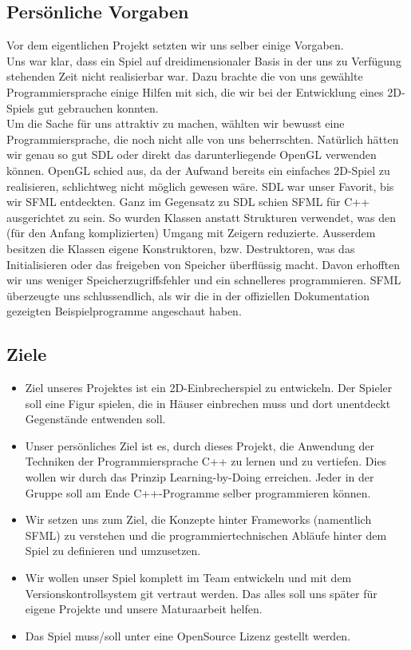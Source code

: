 \documentclass[12pt,a4paper]{scrartcl}
\begin{document}
\subsection{Persönliche Vorgaben}

Vor dem eigentlichen Projekt setzten wir uns selber einige Vorgaben.
\\
Uns war klar, dass ein Spiel auf dreidimensionaler Basis in der uns zu Verfügung stehenden Zeit nicht realisierbar war.
Dazu brachte die von uns gewählte Programmiersprache einige Hilfen mit sich, die wir bei der Entwicklung eines 2D-Spiels gut gebrauchen konnten.
\\
Um die Sache für uns attraktiv zu machen,
wählten wir bewusst eine Programmiersprache, die noch nicht
alle von uns beherrschten. Natürlich hätten wir genau so gut
SDL oder direkt das darunterliegende OpenGL verwenden können. OpenGL
schied aus, da der Aufwand bereits ein einfaches 2D-Spiel zu realisieren,
schlichtweg nicht möglich gewesen wäre. SDL war unser Favorit, bis wir
SFML entdeckten. Ganz im Gegensatz zu SDL schien SFML für C++ ausgerichtet
zu sein. So wurden Klassen anstatt Strukturen verwendet, was den (für den
Anfang komplizierten) Umgang mit Zeigern reduzierte. Ausserdem besitzen die
Klassen eigene Konstruktoren, bzw. Destruktoren, was das Initialisieren
oder das freigeben von Speicher überflüssig macht. Davon erhofften wir uns
weniger Speicherzugriffsfehler und ein schnelleres programmieren. SFML
überzeugte uns schlussendlich, als wir die in der offiziellen Dokumentation
gezeigten Beispielprogramme angeschaut haben.

\subsection{Ziele}
\begin{itemize}
\item 
Ziel unseres Projektes ist ein 2D-Einbrecherspiel zu entwickeln. Der Spieler soll eine Figur spielen, die in Häuser einbrechen muss und dort unentdeckt Gegenstände entwenden soll.
\item
Unser persönliches Ziel ist es, durch dieses Projekt, die Anwendung der Techniken der
Programmiersprache C++ zu lernen und zu vertiefen. Dies wollen wir durch
das Prinzip Learning-by-Doing erreichen. Jeder in der Gruppe soll am Ende
C++-Programme selber programmieren können.
\item
Wir setzen uns zum Ziel,
die Konzepte hinter Frameworks (namentlich SFML) zu verstehen und die
programmiertechnischen Abläufe hinter dem Spiel zu definieren und
umzusetzen.
\item
Wir wollen unser Spiel komplett im Team entwickeln und
mit dem Versionskontrollsystem git vertraut werden. Das alles soll uns später
für eigene Projekte und unsere Maturaarbeit helfen.
\item
Das Spiel muss/soll unter eine OpenSource Lizenz gestellt werden.
\end{itemize}
\end{document}
